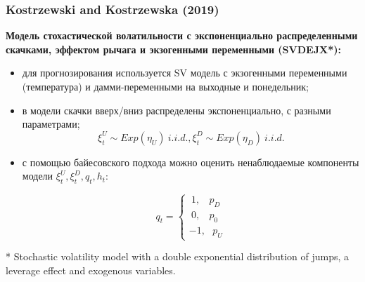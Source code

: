 \documentclass[c, dvipsnames]{beamer}  %
\begin{document}
\begin{frame}[shrink=5]
\frametitle{Kostrzewski and Kostrzewska (2019)} 

\textbf{Модель стохастической волатильности с экспоненциально распределенными скачками, эффектом рычага и экзогенными переменными  (SVDEJX*):
}


\begin{itemize}

	\item  для прогнозирования используется SV модель с экзогенными переменными (температура) и дамми-переменными на выходные и понедельник;
	\item  в модели скачки вверх/вниз распределены экспоненциально, с разными параметрами;
		$$  \xi_{ t}^U \sim Exp(\eta_U) \ i.i.d., \xi_{ t}^D \sim Exp(\eta_D) \ i.i.d.$$
	\item  с помощью байесовского подхода можно оценить ненаблюдаемые компоненты модели $\xi_{ t}^U, \xi_{ t}^D, q_{t}, h_{ t}$:
	
\begin{equation}\label{key}
	q_{ t} =\begin{cases} \ 1, \ \ \ \  p_D\\ \ 0, \ \ \ \   p_0  \\ -1, \ \ \ p_U 
\end{cases}
\end{equation}	

\end{itemize}

* Stochastic
	volatility model with a double exponential distribution of jumps, a leverage
	effect and exogenous variables. 



\end{frame}
\end{document}
